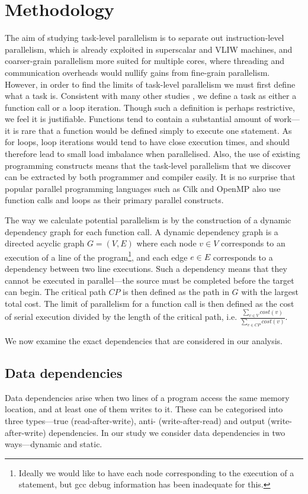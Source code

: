 \section{Methodology}

The aim of studying task-level parallelism is to separate out instruction-level parallelism, which is already exploited in superscalar and VLIW machines, and coarser-grain parallelism more suited for multiple cores, where threading and communication overheads would nullify gains from fine-grain parallelism.
However, in order to find the limits of task-level parallelism we must first define what a task is.
Consistent with many other studies \cite{Kreaseck00limitsof}, we define a task as either a function call or a loop iteration.
Though such a definition is perhaps restrictive, we feel it is justifiable.
Functions tend to contain a substantial amount of work---it is rare that a function would be defined simply to execute one statement.
As for loops, loop iterations would tend to have close execution times, and should therefore lead to small load imbalance when parallelised.
Also, the use of existing programming constructs means that the task-level parallelism that we discover can be extracted by both programmer and compiler easily.
It is no surprise that popular parallel programming languages such as Cilk \cite{blumofe96cilk} and OpenMP \cite{dagum98openmp} also use function calls and loops as their primary parallel constructs.

The way we calculate potential parallelism is by the construction of a dynamic dependency graph for each function call.
A dynamic dependency graph is a directed acyclic graph $G=(V,E)$ where each node $v\in V$ corresponds to an execution of a line of the program\footnote{Ideally we would like to have each node corresponding to the execution of a statement, but gcc debug information has been inadequate for this.}, and each edge $e\in E$ corresponds to a dependency between two line executions.
Such a dependency means that they cannot be executed in parallel---the source must be completed before the target can begin.
The critical path $CP$ is then defined as the path in $G$ with the largest total cost.
The limit of parallelism for a function call is then defined as the cost of serial execution divided by the length of the critical path, i.e. $\frac{\sum_{v\in V} cost(v)}{\sum_{v\in CP} cost(v)}$.

We now examine the exact dependencies that are considered in our analysis.

\subsection{Data dependencies}
Data dependencies arise when two lines of a program access the same memory location, and at least one of them writes to it.
These can be categorised into three types---true (read-after-write), anti- (write-after-read) and output (write-after-write) dependencies.
In our study we consider data dependencies in two ways---dynamic and static.


